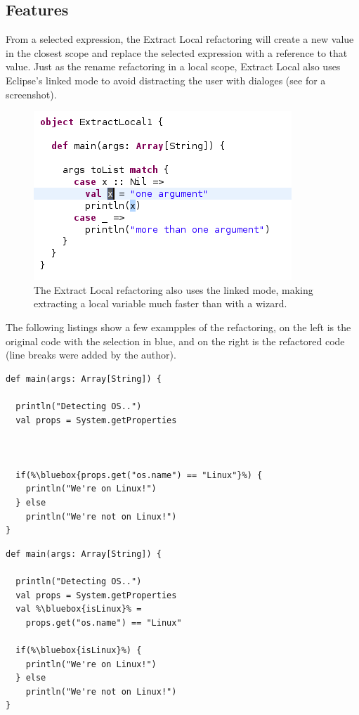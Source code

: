 \documentclass[10pt,a4paper,oneside]{scrreprt}
\begin{document}
\subsection{Features}

From a selected expression, the Extract Local refactoring will create a new value in the closest scope and replace the selected expression with a reference to that value. Just as the rename refactoring in a local scope, Extract Local also uses Eclipse's linked mode to avoid distracting the user with dialoges (see  for a screenshot).

\begin{figure}
  \centering
  \includegraphics[width=0.5\linewidth]{extract_local_screenshot_1.png}
  \caption{The Extract Local refactoring also uses the linked mode, making extracting a local variable much faster than with a wizard.}
  \label{figure:extract-local-screenshot-1}
\end{figure}


The following listings show a few exampples of the refactoring, on the left is the original code with the selection in blue, and on the right is the refactored code (line breaks were added by the author).


\begin{multicols}{2}
\begin{lstlisting}
def main(args: Array[String]) {

  println("Detecting OS..")
  val props = System.getProperties
  


  if(%\bluebox{props.get("os.name") == "Linux"}%) {
    println("We're on Linux!")
  } else
    println("We're not on Linux!")
}
\end{lstlisting}
\begin{lstlisting}
def main(args: Array[String]) {

  println("Detecting OS..")
  val props = System.getProperties
  val %\bluebox{isLinux}% = 
    props.get("os.name") == "Linux"
  
  if(%\bluebox{isLinux}%) {
    println("We're on Linux!")
  } else
    println("We're not on Linux!")
}
\end{lstlisting}
\end{multicols}
\end{document}
